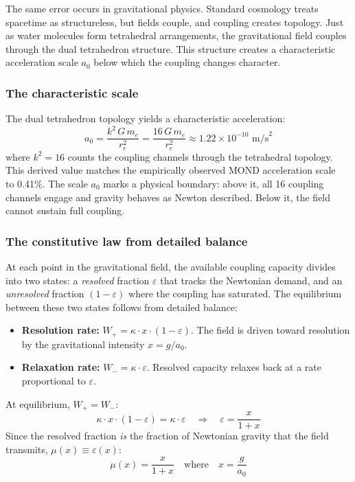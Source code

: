 \documentclass[aps,prd,preprint,superscriptaddress,showpacs,preprintnumbers,amsmath,amssymb,nofootinbib]{revtex4-2}
\begin{document}
The same error occurs in gravitational physics. Standard cosmology treats spacetime as structureless, but fields couple, and coupling creates topology. Just as water molecules form tetrahedral arrangements, the gravitational field couples through the dual tetrahedron structure. This structure creates a characteristic acceleration scale $a_0$ below which the coupling changes character.

\subsubsection*{The characteristic scale}

The dual tetrahedron topology yields a characteristic acceleration:
\begin{equation}
a_0 = \frac{k^2 \, G \, m_e}{r_e^2} = \frac{16 \, G \, m_e}{r_e^2} \approx 1.22 \times 10^{-10} \text{ m/s}^2
\label{eq:a0-dm}
\end{equation}
where $k^2 = 16$ counts the coupling channels through the tetrahedral topology. This derived value matches the empirically observed MOND acceleration scale~\cite{milgrom1983} to 0.41\%. The scale $a_0$ marks a physical boundary: above it, all 16 coupling channels engage and gravity behaves as Newton described. Below it, the field cannot sustain full coupling.

\subsubsection*{The constitutive law from detailed balance}

At each point in the gravitational field, the available coupling capacity divides into two states: a \emph{resolved} fraction $\varepsilon$ that tracks the Newtonian demand, and an \emph{unresolved} fraction $(1 - \varepsilon)$ where the coupling has saturated. The equilibrium between these two states follows from detailed balance:
\begin{itemize}
\item \textbf{Resolution rate:} $W_+ = \kappa \cdot x \cdot (1 - \varepsilon)$. The field is driven toward resolution by the gravitational intensity $x = g/a_0$.
\item \textbf{Relaxation rate:} $W_- = \kappa \cdot \varepsilon$. Resolved capacity relaxes back at a rate proportional to $\varepsilon$.
\end{itemize}
At equilibrium, $W_+ = W_-$:
\begin{equation}
\kappa \cdot x \cdot (1 - \varepsilon) = \kappa \cdot \varepsilon \quad \Longrightarrow \quad \varepsilon = \frac{x}{1 + x}
\end{equation}
Since the resolved fraction \emph{is} the fraction of Newtonian gravity that the field transmits, $\mu(x) \equiv \varepsilon(x)$:
\begin{equation}
\mu(x) = \frac{x}{1+x} \quad \text{where} \quad x = \frac{g}{a_0}
\label{eq:mu-dm}
\end{equation}
\end{document}
